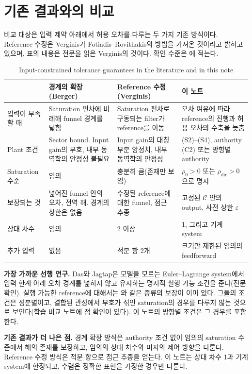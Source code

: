 \documentclass[11pt]{article}\usepackage[margin=1in]{geometry}\usepackage{amsmath,amssymb,amsthm,mathtools}\usepackage{graphicx}\graphicspath{{figures/}{../figures/}{figs/}{./}}\usepackage{enumitem}\usepackage{hyperref}\usepackage{cleveref}\usepackage{tikz}\usetikzlibrary{arrows.meta,positioning,calc,shapes.geometric}\usepackage{float}\usepackage[most]{tcolorbox}\usepackage{kotex}\usepackage{booktabs}\emergencystretch=1.6em\tolerance=2000 \crefname{assumption}{Assumption}{Assumptions}\Crefname{assumption}{Assumption}{Assumptions}\crefname{definition}{Definition}{Definitions}\Crefname{definition}{Definition}{Definitions}\crefname{proposition}{Proposition}{Propositions}\Crefname{proposition}{Proposition}{Propositions}\crefname{fact}{Fact}{Facts}\Crefname{fact}{Fact}{Facts} \newtheorem{assumption}{Assumption}\newtheorem{definition}{Definition}\newtheorem{lemma}{Lemma}\newtheorem{proposition}{Proposition}\newtheorem{theorem}{Theorem}\newtheorem{corollary}{Corollary}\newtheorem{fact}{Fact}\theoremstyle{remark}\newtheorem{remark}{Remark} \newcommand{\R}{\mathbb{R}}\newcommand{\U}{\mathcal U}
\newcommand{\Cset}{\mathcal C}\newcommand{\Pcl}{\mathcal P}\newcommand{\Zset}{\mathcal Z_0}\newcommand{\Xset}{\mathcal X_0}
\begin{document}
\section{기존 결과와의 비교}
\label{sec:comp}

비교 대상은 입력 제약 아래에서 허용 오차를 다루는 두 가지 기존 방식이다. Reference 수정은 Verginis가 Fotiadis--Rovithakis의 방법을 가져온 것이라고 밝히고 있으며, 표의 내용은 전문을 읽은 Verginis의 것이다. 확인 수준은 에 적는다.

\begin{table}[H]
\centering\footnotesize\setlength{\tabcolsep}{4pt}
\caption{Input-constrained tolerance guarantees in the literature and in this note}
\label{tab:comp}
\begin{tabular}{p{3.0cm}p{3.7cm}p{3.6cm}p{3.9cm}}
\toprule
 & 경계의 확장 (Berger) & Reference 수정 (Verginis) & 이 노트 \\
\midrule
입력이 부족할 때 & Saturation 편차에 비례해 funnel 경계를 넓힘 & Saturation 편차로 구동되는 filter가 reference를 이동 & 오차 여유에 따라 reference의 진행과 허용 오차의 수축을 늦춤 \\
Plant 조건 & Sector bound. Input gain의 부호, 내부 동역학의 안정성 불필요 & Input gain의 대칭 부분 양정치, 내부 동역학의 안정성 & (S2)--(S4), authority (C2) 또는 방향별 authority \\
Saturation 수준 & 임의 & 충분히 큼(존재만 보임) & $\rho_0>0$ 또는 $\rho_{\mathrm{dir}}>0$으로 명시 \\
보장되는 것 & 넓어진 funnel 안의 오차, 전역 해. 경계의 상한은 없음 & 수정된 reference에 대한 funnel, 점근 추종 & 고정된 $\Cset$ 안의 output, 사전 상한 $\varepsilon$ \\
상대 차수 & 임의 & 2 이상 & 1, 그리고 기계 system \\
추가 입력 & 없음 & 적분 항 2개 & 크기만 제한된 임의의 feedforward \\
\bottomrule
\end{tabular}
\end{table}

\textbf{가장 가까운 선행 연구.} Das와 Jagtap은 모델을 모르는 Euler--Lagrange system에서 입력 한계 아래 오차 경계를 넓히지 않고 유지하는 명시적 실행 가능 조건을 준다(전문 확인). 실행 가능한 reference에 대해서는 와 같은 종류의 보장이 이미 있다. 그들의 조건은 성분별이고, 결합된 관성에서 부호가 섞인 saturation의 경우를 다루지 않는 것으로 보인다(학습 비교 노트에 점 확인이 있다). 이 노트의 방향별 조건은 그 경우를 포함한다.

\textbf{기존 결과가 더 나은 점.} 경계 확장 방식은 authority 조건 없이 임의의 saturation 수준에서 해의 존재를 보장하고, 임의의 상대 차수와 미지의 제어 방향을 다룬다. Reference 수정 방식은 적분 항으로 점근 추종을 얻는다. 이 노트는 상대 차수 1과 기계 system에 한정되고, 수렴은 정확한 표현을 가정한 경우만 다룬다.
\end{document}
